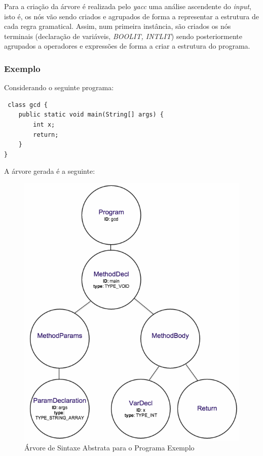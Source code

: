 \documentclass[12pt]{article}
\begin{document}
Para a criação da árvore é realizada pelo \emph{yacc} uma análise ascendente do \emph{input}, isto é, os nós vão sendo criados e agrupados de forma a representar a estrutura de cada regra gramatical. Assim, num primeira instância, são criados os nós terminais (declaração de variáveis, \emph{BOOLIT, INTLIT}) sendo posteriormente agrupados a operadores e expressões de forma a criar a estrutura do programa.

\subsubsection{Exemplo}
Considerando o seguinte programa:

\begin{lstlisting}
 class gcd {
 	public static void main(String[] args) {
    	int x;
    	return;
	} 		
}
\end{lstlisting}

A árvore gerada é a seguinte:

\begin{figure}[H]
       \centering
       \includegraphics[keepaspectratio=true, scale = 0.5]{arvore.png}
       \caption{Árvore de Sintaxe Abstrata para o Programa Exemplo}
\end{figure}
\end{document}
